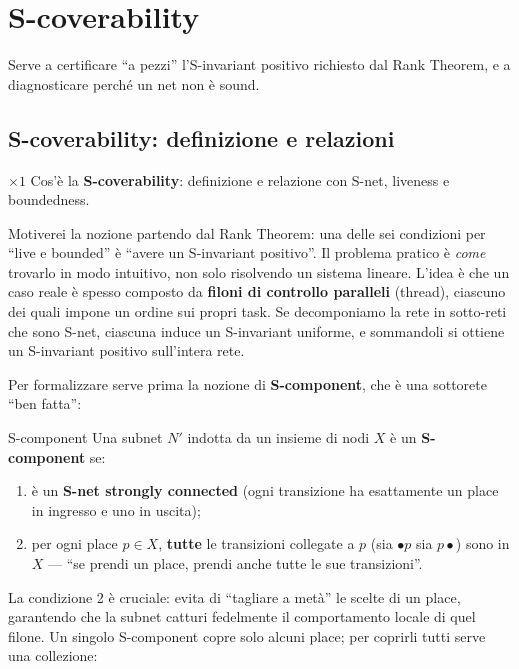 \chapter{S-coverability}

Serve a certificare ``a pezzi'' l'S-invariant positivo richiesto dal Rank Theorem, e a diagnosticare perché un net non è sound.

\section{S-coverability: definizione e relazioni}

\begin{domanda}{$\times 1$}
Cos'è la \textbf{S-coverability}: definizione e relazione con S-net, liveness e boundedness.
\end{domanda}

Motiverei la nozione partendo dal Rank Theorem: una delle sei condizioni per ``live e bounded'' è ``avere un S-invariant positivo''. Il problema pratico è \emph{come} trovarlo in modo intuitivo, non solo risolvendo un sistema lineare. L'idea è che un caso reale è spesso composto da \textbf{filoni di controllo paralleli} (thread), ciascuno dei quali impone un ordine sui propri task. Se decomponiamo la rete in sotto-reti che sono S-net, ciascuna induce un S-invariant uniforme, e sommandoli si ottiene un S-invariant positivo sull'intera rete.

Per formalizzare serve prima la nozione di \textbf{S-component}, che è una sottorete ``ben fatta'':

\begin{definizione}{S-component}
Una subnet $N'$ indotta da un insieme di nodi $X$ è un \textbf{S-component} se:
\begin{enumerate}
  \item è un \textbf{S-net strongly connected} (ogni transizione ha esattamente un place in ingresso e uno in uscita);
  \item per ogni place $p \in X$, \textbf{tutte} le transizioni collegate a $p$ (sia $\bullet p$ sia $p\bullet$) sono in $X$ — ``se prendi un place, prendi anche tutte le sue transizioni''.
\end{enumerate}
\end{definizione}

La condizione 2 è cruciale: evita di ``tagliare a metà'' le scelte di un place, garantendo che la subnet catturi fedelmente il comportamento locale di quel filone. Un singolo S-component copre solo alcuni place; per coprirli tutti serve una collezione:

